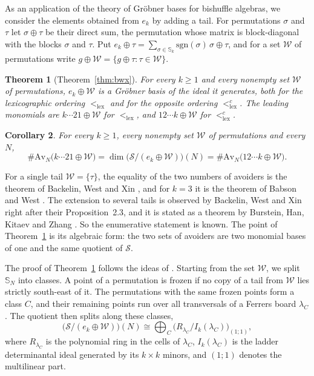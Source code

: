 \documentclass[11pt]{amsart}
\newtheorem{introtheorem}{Theorem}
\newtheorem{introcorollary}[introtheorem]{Corollary}
\theoremstyle{definition}
\theoremstyle{remark}
\newcommand{\bS}{\mathbb{S}}
\newcommand{\sgn}{\mathrm{sgn}}
\newcommand{\cS}{\mathscr{S}}
\newcommand{\cW}{\mathcal{W}}
\newcommand{\Av}{\mathrm{Av}}
\newcommand{\lex}{\mathrm{lex}}
\begin{document}
As an application of the theory of Gr\"obner bases for bishuffle algebras, we consider the elements obtained from $e_k$ by adding a tail. For permutations $\sigma$ and $\tau$ let $\sigma\oplus\tau$ be their direct sum, the permutation whose matrix is block-diagonal with the blocks $\sigma$ and $\tau$. Put $e_k\oplus\tau=\sum_{\sigma\in\bS_k}\sgn(\sigma)\,\sigma\oplus\tau$, and for a set $\cW$ of permutations write $g\oplus\cW=\{g\oplus\tau:\tau\in\cW\}$.

\begin{introtheorem}[Theorem~\ref{thm:bwx}]\label{introthm:gb}
For every $k\ge1$ and every nonempty set $\cW$ of permutations, $e_k\oplus\cW$ is a Gr\"obner basis of the ideal it generates, both for the lexicographic ordering $<_\lex$ and for the opposite ordering $<_\lex^c$. The leading monomials are $k\cdots21\oplus\cW$ for $<_\lex$, and $12\cdots k\oplus\cW$ for $<_\lex^c$.
\end{introtheorem}

\begin{introcorollary}\label{introcor:bwx}
For every $k\ge1$, every nonempty set $\cW$ of permutations and every $N$,
\[
\#\Av_N\bigl(k\cdots21\oplus\cW\bigr)=\dim\bigl(\cS/(e_k\oplus\cW)\bigr)(N)=\#\Av_N\bigl(12\cdots k\oplus\cW\bigr).
\]
\end{introcorollary}

For a single tail $\cW=\{\tau\}$, the equality of the two numbers of avoiders is the theorem of Backelin, West and Xin \cite{BWX}, and for $k=3$ it is the theorem of Babson and West \cite{BW}. The extension to several tails is observed by Backelin, West and Xin right after their Proposition~2.3, and it is stated as a theorem by Burstein, Han, Kitaev and Zhang \cite[Theorem~2]{BHKZ}. So the enumerative statement is known. The point of Theorem~\ref{introthm:gb} is its algebraic form: the two sets of avoiders are two monomial bases of one and the same quotient of $\cS$.

The proof of Theorem~\ref{introthm:gb} follows the ideas of \cite{BW,BWX}. Starting from the set $\cW$, we split $\bS_N$ into classes. A point of a permutation is frozen if no copy of a tail from $\cW$ lies strictly south-east of it. The permutations with the same frozen points form a class $C$, and their remaining points run over all transversals of a Ferrers board $\lambda_C$. The quotient then splits along these classes,
\[
\bigl(\cS/(e_k\oplus\cW)\bigr)(N)\cong\bigoplus_{C}\bigl(R_{\lambda_C}/I_k(\lambda_C)\bigr)_{(1;1)},
\]
where $R_{\lambda_C}$ is the polynomial ring in the cells of $\lambda_C$, $I_k(\lambda_C)$ is the ladder determinantal ideal generated by its $k\times k$ minors, and $(1;1)$ denotes the multilinear part.
\end{document}
